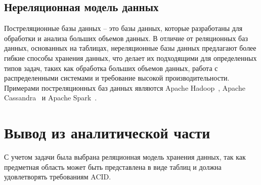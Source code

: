 \subsection*{Нереляционная модель данных}
Постреляционные базы данных -- это базы данных, которые разработаны для обработки и анализа больших объемов данных. В отличие от реляционных баз данных, основанных на таблицах, нереляционные базы данных предлагают более гибкие способы хранения данных, что делает их подходящими для определенных типов задач, таких как обработка больших объемов данных, работа с распределенными системами и требование высокой производительности. Примерами постреляционных баз данных являются Apache Hadoop~\cite{hadoop}, Apache Cassandra~\cite{cassandra} и Apache Spark~\cite{spark}.

\section{Вывод из аналитической части}
С учетом задачи была выбрана реляционная модель хранения данных, так как предметная область может быть представлена в виде таблиц и должна удовлетворять требованиям ACID.
